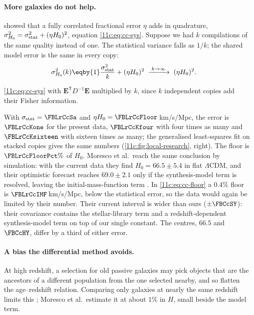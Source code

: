 \paragraph{More galaxies do not help.}  showed that a fully
correlated fractional error $\eta$ adds in quadrature,
$\sigma^2_{H_0}=\sigma^2_{\rm stat}+(\eta H_0)^2$, equation \eqref{11c:eq:cc-sys}. Suppose we had
$k$ compilations of the same quality instead of one. The statistical variance falls as
$1/k$; the shared model error is the same in every copy:
\begin{align}
  \sigma^2_{H_0}(k)
  &\eqby{1}\frac{\sigma^2_{\rm stat}}{k}+(\eta H_0)^2
   \;\xrightarrow{\;k\to\infty\;}\;(\eta H_0)^2 .
  \label{11c:eq:cc-floor}
\end{align}
\begin{explain}
  \item \eqref{11c:eq:cc-sys} with $\bm E^{\mathsf T}D^{-1}\bm E$ multiplied by $k$, since
        $k$ independent copies add their Fisher information.
\end{explain}
With $\sigma_{\rm stat}=\FBLrCcSa$ and $\eta H_0=\FBLrCcFloor$\,km/s/Mpc, the error is
$\FBLrCcKone$ for the present data, $\FBLrCcKfour$ with four times as many and
$\FBLrCcKsixteen$ with sixteen times as many; the generalised least-squares fit on stacked
copies gives the same numbers (\cref{11c:fig:local-research}, right). The floor is
$\FBLrCcFloorPct\%$ of $H_0$. Moresco et al.\ reach the same conclusion by simulation: with
the current data they find $H_0=66.5\pm5.4$ in flat $\Lambda$CDM, and their optimistic
forecast reaches $69.0\pm2.1$ only if the synthesis-model term is resolved, leaving the
initial-mass-function term \cite[Sec.~3.1.6, Table~2]{Moresco2022}. In
\eqref{11c:eq:cc-floor} a $0.4\%$ floor is $\FBLrCcIMF$\,km/s/Mpc, below the statistical
error, so the data would again be limited by their number. Their current interval is
wider than ours ($\pm\FBCcSY$): their covariance contains the stellar-library term and a
redshift-dependent synthesis-model term on top of our single constant. The centres,
$66.5$ and $\FBCcHY$, differ by a third of either error.

\paragraph{A bias the differential method avoids.} At high redshift, a selection for
old passive galaxies may pick objects that are the ancestors of a different population
from the one selected nearby, and so flatten the age--redshift relation. Comparing only
galaxies at nearly the same redshift limits this ; Moresco
et al.\ estimate it at about $1\%$ in $H$, small beside the model term.

